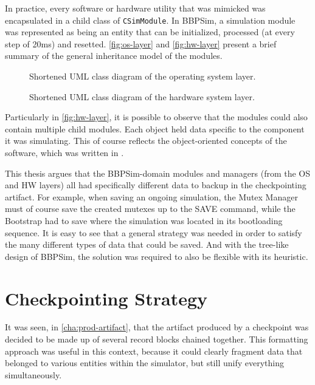 {In practice, every software or hardware utility that was mimicked was encapsulated in a child class of \texttt{CSimModule}. In BBPSim, a simulation module was represented as being an entity that can be initialized, processed (at every step of 20ms) and resetted. \autoref{fig:os-layer} and \autoref{fig:hw-layer} present a brief summary of the general inheritance model of the modules. 
\begin{figure}[htbp]
	\vspace{12pt}
	\centering
	\footnotesize
	
	\caption{Shortened UML class diagram of the operating system layer.}
	\label{fig:os-layer}
\end{figure}
\begin{figure}[htbp]
	\vspace{12pt}
	\centering
	\footnotesize
	
	\caption{Shortened UML class diagram of the hardware system layer.}
	\label{fig:hw-layer}
\end{figure}

Particularly in \autoref{fig:hw-layer}, it is possible to observe that the modules could also contain multiple child modules. Each object held data specific to the component it was simulating. This of course reflects the object-oriented concepts of the software, which was written in \Cpp.

This thesis argues that the BBPSim-domain modules and managers (from the OS and HW layers) all had specifically different data to backup in the checkpointing artifact. For example, when saving an ongoing simulation, the Mutex Manager must of course save the created mutexes up to the SAVE command, while the Bootstrap had to save where the simulation was located in its bootloading sequence. It is easy to see that a general strategy was needed in order to satisfy the many different types of data that could be saved. And with the tree-like design of BBPSim, the solution was required to also be flexible with its heuristic. 

\section{Checkpointing Strategy}
It was seen, in \autoref{cha:prod-artifact}, that the artifact produced by a checkpoint was decided to be made up of several record blocks chained together. This formatting approach was useful in this context, because it could clearly fragment data that belonged to various entities within the simulator, but still unify everything simultaneously. 

}
